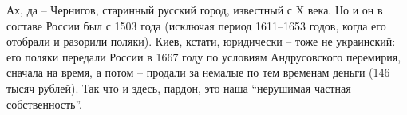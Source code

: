 Ах, да – Чернигов, старинный русский город, известный с X века. Но и он в
составе России был с 1503 года (исключая период 1611–1653 годов, когда его
отобрали и разорили поляки). Киев, кстати, юридически – тоже не украинский: его
поляки передали России в 1667 году по условиям Андрусовского перемирия, сначала
на время, а потом – продали за немалые по тем временам деньги (146 тысяч
рублей). Так что и здесь, пардон, это наша \enquote{нерушимая частная собственность}.
